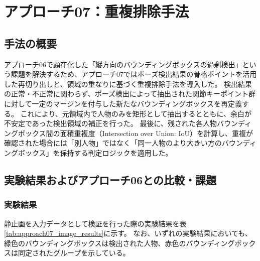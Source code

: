 \section{アプローチ07：重複排除手法}

\subsection{手法の概要}
アプローチ06で顕在化した「縦方向のバウンディングボックスの過剰検出」という課題を解決するため、アプローチ07ではポーズ検出結果の骨格ポイントを活用した再切り出しと、領域の重なりに基づく重複排除手法を導入した。
検出結果の正常・不正常に関わらず、ポーズ検出によって抽出された関節キーポイント群に対して一定のマージンを付与した新たなバウンディングボックスを再定義する。
これにより、元領域内で人物のみを矩形として抽出するとともに、余白が不安定であった検出領域の補正を行った。
最後に、残された各人物バウンディングボックス間の面積重複度（Intersection over Union: IoU）を計算し、重複が確認された場合には「別人物」ではなく「同一人物のより大きい方のバウンディングボックス」を保持する判定ロジックを適用した。

\subsection{実験結果およびアプローチ06との比較・課題}

\subsubsection{実験結果}
静止画を入力データとして検証を行った際の実験結果を表\ref{tab:approach07_image_results}に示す。
なお、いずれの実験結果においても、緑色のバウンディングボックスは検出された人物、赤色のバウンディングボックスは同定されたグループを示している。

